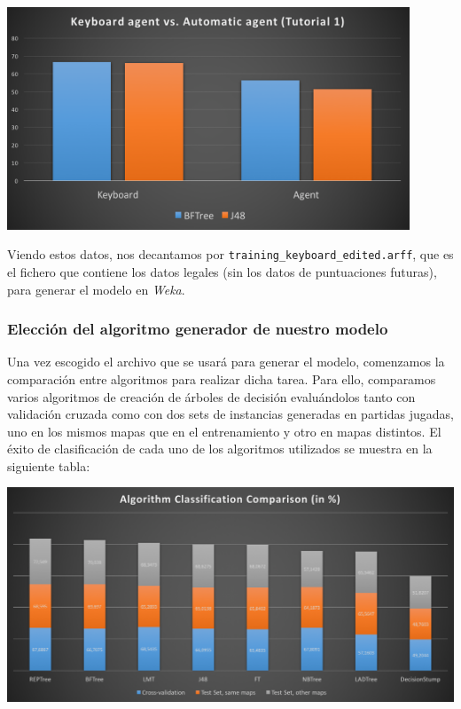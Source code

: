 \documentclass[12pt]{article}
\begin{document}
\begin{center} \includegraphics[width=12cm]{kb_vs_aa} \end{center}

Viendo estos datos, nos decantamos por \texttt{training\_keyboard\_edited.arff}, que es el fichero que contiene los datos legales (sin los datos de puntuaciones futuras), para generar el modelo en \emph{Weka}.

\subsubsection{Elección del algoritmo generador de nuestro modelo}

Una vez escogido el archivo que se usará para generar el modelo, comenzamos la comparación entre algoritmos para realizar dicha tarea. Para ello, comparamos varios algoritmos de creación de árboles de decisión evaluándolos tanto con validación cruzada como con dos sets de instancias generadas en partidas jugadas, uno en los mismos mapas que en el entrenamiento y otro en mapas distintos. El éxito de clasificación de cada uno de los algoritmos utilizados se muestra en la siguiente tabla:

\vspace{0.3cm}

\noindent \includegraphics[width=\textwidth]{algorithm_comparison}
\end{document}
